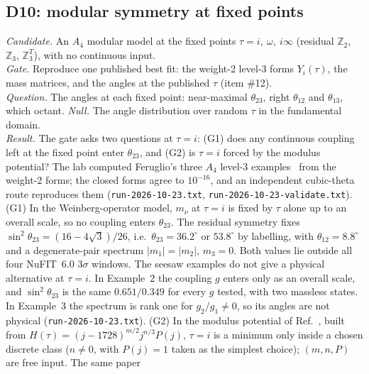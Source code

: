 \subsection{D10: modular symmetry at fixed points}\label{sec:D10}
\emph{Candidate.} An $A_4$ modular model at the fixed points $\tau=i,\ \omega,\ i\infty$
(residual $\mathbb Z_2$, $\mathbb Z_3$, $\mathbb Z_3^T$), with no continuous input.\\
\emph{Gate.} Reproduce one published best fit: the weight-2 level-3 forms $Y_i(\tau)$, the mass
matrices, and the angles at the published $\tau$ (item \#12).\\
\emph{Question.} The angles at each fixed point: near-maximal $\theta_{23}$, right $\theta_{12}$
and $\theta_{13}$, which octant. \emph{Null.} The angle distribution over random $\tau$ in the
fundamental domain.\\
\emph{Result.} The gate asks two questions at $\tau=i$: (G1) does any continuous coupling left at the
fixed point enter $\theta_{23}$, and (G2) is $\tau=i$ forced by the modulus potential? The lab computed
Feruglio's three $A_4$ level-3 examples~\cite{feruglio2017} from the weight-2 forms; the closed forms
agree to $10^{-16}$, and an independent cubic-theta route reproduces them
(\texttt{run-2026-10-23.txt}, \texttt{run-2026-10-23-validate.txt}).
(G1) In the Weinberg-operator model, $m_\nu$ at $\tau=i$ is fixed by $\tau$ alone up to an overall
scale, so no coupling enters $\theta_{23}$. The residual symmetry fixes
$\sin^2\theta_{23}=(16-4\sqrt3)/26$, i.e.\ $\theta_{23}=36.2^\circ$ or $53.8^\circ$ by labelling, with
$\theta_{12}=8.8^\circ$ and a degenerate-pair spectrum $|m_1|=|m_2|$, $m_3=0$. Both values lie outside
all four NuFIT~6.0 $3\sigma$ windows. The seesaw examples do not give a physical alternative at
$\tau=i$. In Example~2 the coupling $g$ enters only as an overall scale, and $\sin^2\theta_{23}$ is
the same $0.651/0.349$ for every $g$ tested, with two massless states. In Example~3 the spectrum is
rank one for $g_2/g_1\neq0$, so its angles are not physical (\texttt{run-2026-10-23.txt}).
(G2) In the modulus potential of Ref.~\cite{npp2022}, built from
$H(\tau)=(j-1728)^{m/2}j^{n/3}P(j)$, $\tau=i$ is a minimum only inside a chosen discrete class
($n\neq0$, with $P(j)=1$ taken as the simplest choice); $(m,n,P)$ are free input. The same paper
